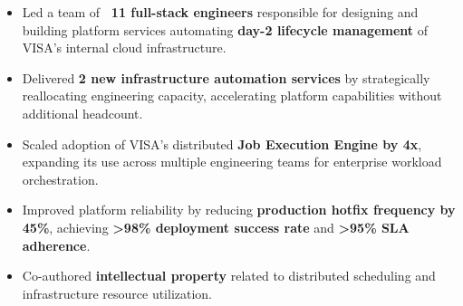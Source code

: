 \begin{itemize}
    \item Led a team of \textbf{~11 full-stack engineers} responsible for designing and building platform services automating \textbf{day-2 lifecycle management} of VISA's internal cloud infrastructure.
    \item Delivered \textbf{2 new infrastructure automation services} by strategically reallocating engineering capacity, accelerating platform capabilities without additional headcount.
    \item Scaled adoption of VISA's distributed \textbf{Job Execution Engine by 4x}, expanding its use across multiple engineering teams for enterprise workload orchestration.
    \item Improved platform reliability by reducing \textbf{production hotfix frequency by 45\%}, achieving \textbf{>98\% deployment success rate} and \textbf{>95\% SLA adherence}.
    \item Co-authored \textbf{intellectual property} related to distributed scheduling and infrastructure resource utilization.
\end{itemize}
